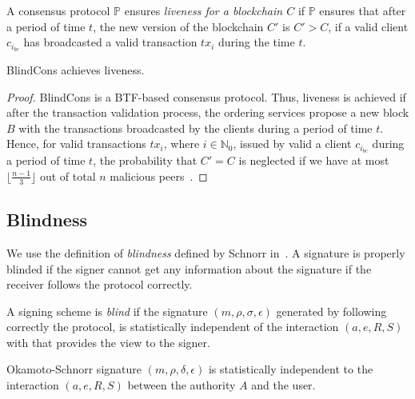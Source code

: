 \documentclass[conference]{llncs}
\newcommand{\name}{BlindCons}
\begin{document}
\begin{definition}[Liveness]
A consensus protocol $\mathbb{P}$ ensures \emph{liveness for a blockchain $C$} if $\mathbb{P}$ ensures that after a period of time $t$, the new version of the blockchain $C'$ is $C' > C$, if a valid client $c_{i_{bc}}$ has broadcasted a valid transaction $tx_i$ during the time $t$. 
\end{definition}

\begin{theorem}
\name{} achieves liveness.
\end{theorem}

\begin{proof}
\name{} is a BTF-based consensus protocol. Thus, liveness is achieved if after the transaction validation process, the ordering services propose a new block $B$ with the transactions broadcasted by the clients during a period of time $t$. Hence, for valid transactions $tx_i$, where $i\in \mathbb{N}_0$, issued by valid a client $c_{i_{bc}}$ during a period of time $t$, the probability that $C'= C$ is neglected if we have at most $\lfloor\frac{n-1}{3}\rfloor$ out of total $n$ malicious peers~\cite{castro1999practical}.
\end{proof}

\subsection{Blindness}

We use the definition of \emph{blindness} defined by Schnorr in~\cite{schnorr2001security}. A signature is properly blinded if the signer cannot get any information about the signature if the receiver follows the protocol correctly.

\begin{definition}
A signing scheme is \emph{blind} if the signature $(m,\rho,\sigma,\epsilon)$ generated by following correctly the protocol, is statistically independent of the interaction $(a,e,R,S)$ with that provides the view to the signer.
\end{definition}

\begin{theorem}
Okamoto-Schnorr signature $(m,\rho,\delta,\epsilon)$ is statistically independent to the interaction $(a,e,R,S)$ between the authority $A$ and the user.
\end{theorem}
\end{document}
